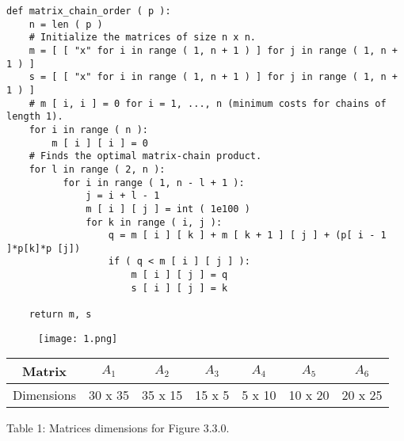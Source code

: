 \begin{lstlisting}
def matrix_chain_order ( p ):
    n = len ( p )
    # Initialize the matrices of size n x n.
    m = [ [ "x" for i in range ( 1, n + 1 ) ] for j in range ( 1, n + 1 ) ]
    s = [ [ "x" for i in range ( 1, n + 1 ) ] for j in range ( 1, n + 1 ) ]
    # m [ i, i ] = 0 for i = 1, ..., n (minimum costs for chains of length 1).
    for i in range ( n ):
        m [ i ] [ i ] = 0
    # Finds the optimal matrix-chain product.
    for l in range ( 2, n ):
          for i in range ( 1, n - l + 1 ):
              j = i + l - 1
              m [ i ] [ j ] = int ( 1e100 )
              for k in range ( i, j ):
                  q = m [ i ] [ k ] + m [ k + 1 ] [ j ] + (p[ i - 1 ]*p[k]*p [j])
                  if ( q < m [ i ] [ j ] ):
                      m [ i ] [ j ] = q
                      s [ i ] [ j ] = k
                      
	return m, s
\end{lstlisting} \hfill

\begin{figure}[H]
\texttt{[image: 1.png]}
\centering \linebreak {}
\end{figure}

\begin{center}
\begin{tabular}{c c c c c c c}
\toprule
\toprule
\hspace{5px} Matrix \hspace{5px} & \hspace{20px} $A_{1}$ \hspace{20px} & \hspace{20px} $A_{2}$ \hspace{20px} & \hspace{20px} $A_{3}$ \hspace{20px} & \hspace{20px} $A_{4}$ \hspace{20px} & \hspace{20px} $A_{5}$ \hspace{20px} & \hspace{20px} $A_{6}$ \hspace{20px} \\
\toprule
\toprule
Dimensions & 30 x 35 & 35 x 15 & 15 x 5 & 5 x 10 & 10 x 20 & 20 x 25 \\
\bottomrule
\end{tabular}
\linebreak \linebreak Table 1: Matrices dimensions for Figure 3.3.0.
\end{center} \hfill \break

